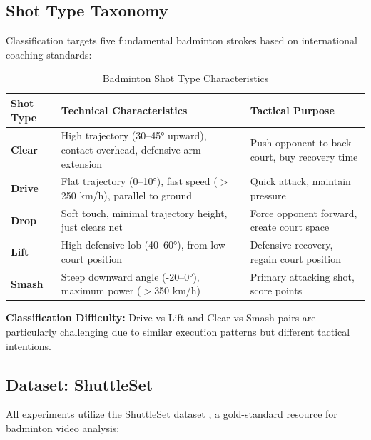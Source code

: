 \documentclass[11pt,a4paper]{article}
\begin{document}
\subsection{Shot Type Taxonomy}

Classification targets five fundamental badminton strokes based on international coaching standards:

\begin{table}[H]
\centering
\caption{Badminton Shot Type Characteristics}
\begin{tabular}{lp{6cm}p{3cm}}
\toprule
Shot Type & Technical Characteristics & Tactical Purpose \\
\midrule
\textbf{Clear} & High trajectory (30--45° upward), contact overhead, defensive arm extension & Push opponent to back court, buy recovery time \\
\textbf{Drive} & Flat trajectory (0--10°), fast speed ($>$250 km/h), parallel to ground & Quick attack, maintain pressure \\
\textbf{Drop} & Soft touch, minimal trajectory height, just clears net & Force opponent forward, create court space \\
\textbf{Lift} & High defensive lob (40--60°), from low court position & Defensive recovery, regain court position \\
\textbf{Smash} & Steep downward angle (-20--0°), maximum power ($>$350 km/h) & Primary attacking shot, score points \\
\bottomrule
\end{tabular}
\end{table}

\textbf{Classification Difficulty:} Drive vs Lift and Clear vs Smash pairs are particularly challenging due to similar execution patterns but different tactical intentions.

\subsection{Dataset: ShuttleSet}

All experiments utilize the ShuttleSet dataset \cite{ShuttleSet}, a gold-standard resource for badminton video analysis:
\end{document}
